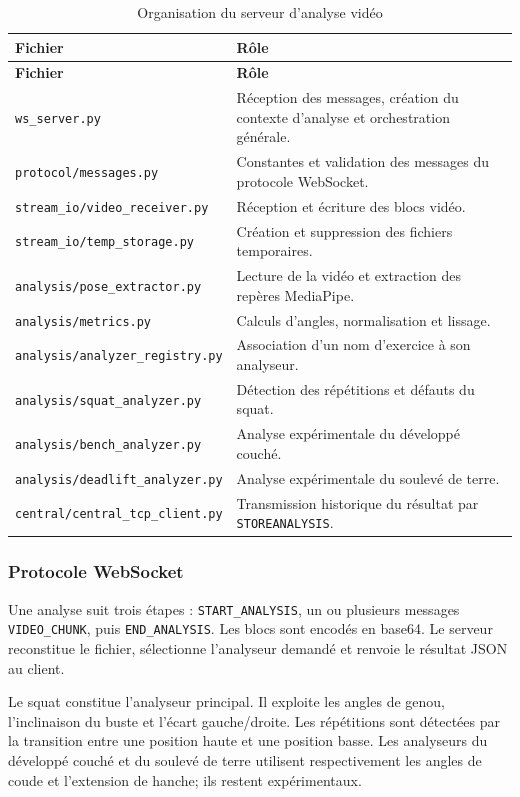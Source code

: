 \documentclass[11pt,a4paper]{article}
\newcommand{\code}[1]{\nolinkurl{#1}}
\begin{document}
\begin{longtable}{L{5.2cm}L{10.8cm}}
\caption{Organisation du serveur d'analyse vidéo}\label{tab:analyse-files}\\
\toprule
\textbf{Fichier} & \textbf{Rôle} \\
\midrule
\endfirsthead
\toprule
\textbf{Fichier} & \textbf{Rôle} \\
\midrule
\endhead
\code{ws_server.py} & Réception des messages, création du contexte d'analyse et orchestration générale. \\
\code{protocol/messages.py} & Constantes et validation des messages du protocole WebSocket. \\
\code{stream_io/video_receiver.py} & Réception et écriture des blocs vidéo. \\
\code{stream_io/temp_storage.py} & Création et suppression des fichiers temporaires. \\
\code{analysis/pose_extractor.py} & Lecture de la vidéo et extraction des repères MediaPipe. \\
\code{analysis/metrics.py} & Calculs d'angles, normalisation et lissage. \\
\code{analysis/analyzer_registry.py} & Association d'un nom d'exercice à son analyseur. \\
\code{analysis/squat_analyzer.py} & Détection des répétitions et défauts du squat. \\
\code{analysis/bench_analyzer.py} & Analyse expérimentale du développé couché. \\
\code{analysis/deadlift_analyzer.py} & Analyse expérimentale du soulevé de terre. \\
\code{central/central_tcp_client.py} & Transmission historique du résultat par \code{STOREANALYSIS}. \\
\bottomrule
\end{longtable}

\subsubsection{Protocole WebSocket}

Une analyse suit trois étapes : \code{START_ANALYSIS}, un ou plusieurs messages \code{VIDEO_CHUNK}, puis \code{END_ANALYSIS}. Les blocs sont encodés en base64. Le serveur reconstitue le fichier, sélectionne l'analyseur demandé et renvoie le résultat JSON au client.

Le squat constitue l'analyseur principal. Il exploite les angles de genou, l'inclinaison du buste et l'écart gauche/droite. Les répétitions sont détectées par la transition entre une position haute et une position basse. Les analyseurs du développé couché et du soulevé de terre utilisent respectivement les angles de coude et l'extension de hanche; ils restent expérimentaux.
\end{document}
